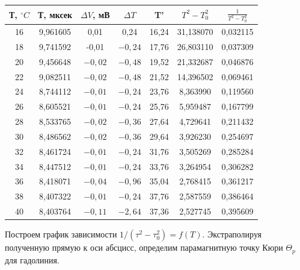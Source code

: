 \documentclass[a4paper, 12pt]{article}%
\begin{document}
\begin{center}
\begin{table}[!h]
\begin{tabular}{|c|c|c|c|c|c|c|}
\hline Т, $^{\circ} C$ & Т, мксек & $\Delta V$, мВ & $\Delta T$ & T' & $T^2-T_0^2$ & $\frac{1}{T^2-T_0^2}$ \\
\hline 16 & 9,961605 & 0,01 & 0,24 & 16,24 & 31,138070 & 0,032115 \\
\hline 18 & 9,741592 & -0,01 & $-0,24$ & 17,76 & 26,803110 & 0,037309 \\
\hline 20 & 9,456648 & $-0,02$ & $-0,48$ & 19,52 & 21,332687 & 0,046876 \\
\hline 22 & 9,082511 & $-0,02$ & $-0,48$ & 21,52 & 14,396502 & 0,069461 \\
\hline 24 & 8,744112 & $-0,01$ & $-0,24$ & 23,76 & 8,363990 & 0,119560 \\
\hline 26 & 8,605521 & $-0,01$ & $-0,24$ & 25,76 & 5,959487 & 0,167799 \\
\hline 28 & 8,533765 & $-0,02$ & $-0,36$ & 27,64 & 4,729641 & 0,211432 \\
\hline 30 & 8,486562 & $-0,02$ & $-0,36$ & 29,64 & 3,926230 & 0,254697 \\
\hline 32 & 8,461724 & $-0,01$ & $-0,24$ & 31,76 & 3,505269 & 0,285284 \\
\hline 34 & 8,447512 & $-0,01$ & $-0,24$ & 33,76 & 3,264954 & 0,306282 \\
\hline 36 & 8,418071 & $-0,04$ & $-0,96$ & 35,04 & 2,768415 & 0,361217 \\
\hline 38 & 8,407322 & $-0,01$ & $-0,24$ & 37,76 & 2,587559 & 0,386464 \\
\hline 40 & 8,403764 & $-0,11$ & $-2,64$ & 37,36 & 2,527745 & 0,395609 \\
\hline
\end{tabular}
\end{table}
\end{center}

Построем график зависимости $1 /\left(\tau^{2} - \tau_{0}^{2}\right)=f(T)$. Экстраполируя полученную прямую к оси абсцисс, определим парамагнитную точку Кюри $\Theta_{p}$ для гадолиния.
\end{document}
